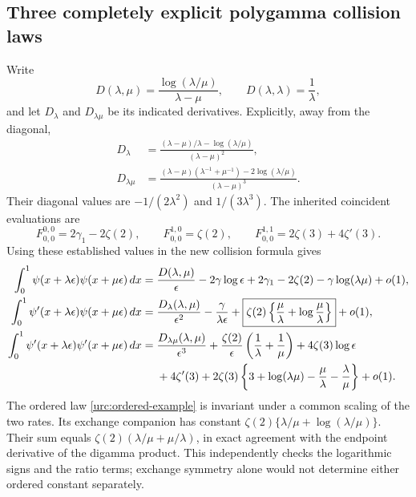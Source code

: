 \subsection{Three completely explicit polygamma collision laws}

Write
\begin{equation}\label{urc:D}
 D(\lambda,\mu)=\frac{\log(\lambda/\mu)}{\lambda-\mu},
 \qquad D(\lambda,\lambda)=\frac1\lambda,
\end{equation}
and let $D_\lambda$ and $D_{\lambda\mu}$ be its indicated
derivatives. Explicitly, away from the diagonal,
\begin{align*}
 D_\lambda&=\frac{(\lambda-\mu)/\lambda-\log(\lambda/\mu)}
                  {(\lambda-\mu)^2},\\
 D_{\lambda\mu}
 &=\frac{(\lambda-\mu)(\lambda^{-1}+\mu^{-1})
                       -2\log(\lambda/\mu)}{(\lambda-\mu)^3}.
\end{align*}
Their diagonal values are $-1/(2\lambda^2)$ and
$1/(3\lambda^3)$. The inherited coincident evaluations \cite{LatticeIncoming} are
\[
 F_{0,0}^{0,0}=2\gamma_1-2\zeta(2),\qquad
 F_{0,0}^{1,0}=\zeta(2),\qquad
 F_{0,0}^{1,1}=2\zeta(3)+4\zeta'(3).
\]
Using these established values in the new collision formula gives
\begin{align}
 \int_0^1\psi(x+\lambda\epsilon)\psi(x+\mu\epsilon)\,dx
 ={}&\frac{D(\lambda,\mu)}\epsilon-2\gamma\log\epsilon
       +2\gamma_1-2\zeta(2)-\gamma\log(\lambda\mu)+o(1),
 \label{urc:digamma-example}\\
 \int_0^1\psi'(x+\lambda\epsilon)\psi(x+\mu\epsilon)\,dx
 ={}&\frac{D_\lambda(\lambda,\mu)}{\epsilon^2}
       -\frac{\gamma}{\lambda\epsilon}
       +\boxed{\zeta(2)\left\{\frac\mu\lambda+
                               \log\frac\mu\lambda\right\}}
       +o(1),
 \label{urc:ordered-example}\\
 \int_0^1\psi'(x+\lambda\epsilon)\psi'(x+\mu\epsilon)\,dx
 ={}&\frac{D_{\lambda\mu}(\lambda,\mu)}{\epsilon^3}
       +\frac{\zeta(2)}\epsilon
                       \left(\frac1\lambda+\frac1\mu\right)
       +4\zeta(3)\log\epsilon\notag\\
 &+4\zeta'(3)+2\zeta(3)
       \left\{3+\log(\lambda\mu)-\frac\mu\lambda-
                                      \frac\lambda\mu\right\}+o(1).
 \label{urc:trigamma-example}
\end{align}
The ordered law \eqref{urc:ordered-example} is invariant under a
common scaling of the two rates. Its exchange companion has
constant $\zeta(2)\{\lambda/\mu+\log(\lambda/\mu)\}$. Their
sum equals $\zeta(2)(\lambda/\mu+\mu/\lambda)$, in exact
agreement with the endpoint derivative of the digamma product.
This independently checks the logarithmic signs and the ratio
terms; exchange symmetry alone would not determine either ordered
constant separately.

